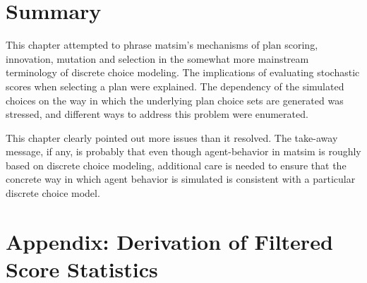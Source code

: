 \section{\label{sec:Summary}Summary}
This chapter attempted to phrase \gls{matsim}'s mechanisms of plan scoring,
innovation, mutation and selection in the somewhat more mainstream
terminology of discrete choice modeling. The implications of evaluating
stochastic scores when selecting a plan were explained. The dependency
of the simulated choices on the way in which the underlying plan choice sets
are generated was stressed, and different ways to address this problem
were enumerated.


This chapter clearly pointed out more issues than it resolved. The take-away message,
if any, is probably that even though agent-behavior in \gls{matsim} is roughly based
on discrete choice modeling, additional care is needed to ensure that the concrete way 
in which agent behavior is simulated is consistent with a particular discrete choice model.


\section*{Appendix: Derivation of Filtered Score Statistics}

